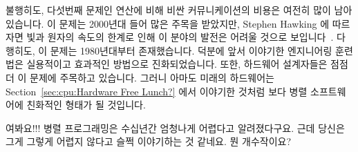 불행히도, 다섯번째 문제인 연산에 비해 비싼 커뮤니케이션의 비용은 여전히 많이
남아있습니다.
이 문제는 2000년대 들어 많은 주목을 받았지만, Stephen Hawking 에 따르자면 빛과
원자의 속도의 한계로 인해 이 분야의 발전은 어려울 것으로
보입니다~\cite{BryanGardiner2007,GordonMoore03a}.
다행히도, 이 문제는 1980년대부터 존재했습니다.
덕분에 앞서 이야기한 엔지니어링 훈련법은 실용적이고 효과적인 방법으로
진화되었습니다.
또한, 하드웨어 설계자들은 점점 더 이 문제에 주목하고 있습니다.
그러니 아마도 미래의 하드웨어는 Section~\ref{sec:cpu:Hardware Free Lunch?} 에서
이야기한 것처럼 보다 병렬 소프트웨어에 친화적인 형태가 될 것입니다.

\QuickQuiz{}
	여봐요!!!
	병렬 프로그래밍은 수십년간 엄청나게 어렵다고 알려졌다구요.
	근데 당신은 그게 그렇게 어렵지 않다고 슬쩍 이야기하는 것 같네요.
	뭔 개수작이요?

